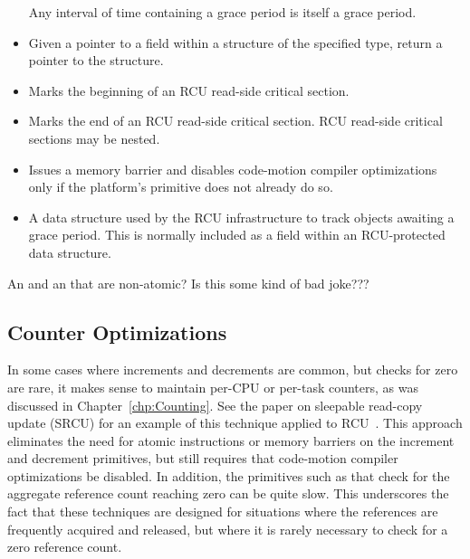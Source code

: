 \begin{itemize}
	Any interval of time containing a grace period is itself a
	grace period.
\item	{}
	Given a pointer  to a field  within a structure
	of the specified type, return a pointer to the structure.
\item	{}
	Marks the beginning of an RCU read-side critical section.
\item	{}
	Marks the end of an RCU read-side critical section.
	RCU read-side critical sections may be nested.
\item	{}
	Issues a memory barrier and disables code-motion compiler
	optimizations only if the platform's 
	primitive does not already do so.
\item	{}
	A data structure used by the RCU infrastructure to track
	objects awaiting a grace period.
	This is normally included as a field within an RCU-protected
	data structure.
\end{itemize}

\QuickQuiz{}
	An  and an  that are
	non-atomic?
	Is this some kind of bad joke???
 \QuickQuizEnd

\subsection{Counter Optimizations}
\label{sec:together:Counter Optimizations}

In some cases where increments and decrements are common, but checks
for zero are rare, it makes sense to maintain per-CPU or per-task
counters, as was discussed in Chapter~\ref{chp:Counting}.
See the paper on sleepable read-copy update
(SRCU) for an example of this technique applied to
RCU~\cite{PaulEMcKenney2006c}.
This approach eliminates the need for atomic instructions or memory
barriers on the increment and decrement primitives, but still requires
that code-motion compiler optimizations be disabled.
In addition, the primitives such as 
that check for the aggregate reference
count reaching zero can be quite slow.
This underscores the fact that these techniques are designed
for situations where the references are frequently acquired and
released, but where it is rarely necessary to check for a zero
reference count.

